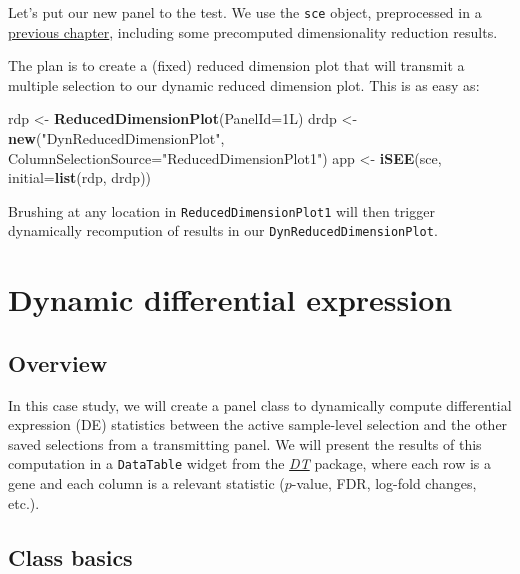 \documentclass[
]{book}
\newenvironment{Shaded}{\begin{snugshade}}{\end{snugshade}}
\newcommand{\DataTypeTok}[1]{\textcolor[rgb]{0.13,0.29,0.53}{#1}}
\newcommand{\KeywordTok}[1]{\textcolor[rgb]{0.13,0.29,0.53}{\textbf{#1}}}
\newcommand{\NormalTok}[1]{#1}
\newcommand{\StringTok}[1]{\textcolor[rgb]{0.31,0.60,0.02}{#1}}
\begin{document}
Let's put our new panel to the test.
We use the \texttt{sce} object, preprocessed in a \protect\hyperlink{developing}{previous chapter}, including some precomputed dimensionality reduction results.

The plan is to create a (fixed) reduced dimension plot that will transmit a multiple selection to our dynamic reduced dimension plot.
This is as easy as:

\begin{Shaded}
\begin{Highlighting}[]
\NormalTok{rdp <-}\StringTok{ }\KeywordTok{ReducedDimensionPlot}\NormalTok{(}\DataTypeTok{PanelId=}\NormalTok{1L)}
\NormalTok{drdp <-}\StringTok{ }\KeywordTok{new}\NormalTok{(}\StringTok{"DynReducedDimensionPlot"}\NormalTok{, }\DataTypeTok{ColumnSelectionSource=}\StringTok{"ReducedDimensionPlot1"}\NormalTok{)}
\NormalTok{app <-}\StringTok{ }\KeywordTok{iSEE}\NormalTok{(sce, }\DataTypeTok{initial=}\KeywordTok{list}\NormalTok{(rdp, drdp))}
\end{Highlighting}
\end{Shaded}

Brushing at any location in \texttt{ReducedDimensionPlot1} will then trigger dynamically recompution of results in our \texttt{DynReducedDimensionPlot}.

\hypertarget{dynamic-differential-expression}{%
\chapter{Dynamic differential expression}\label{dynamic-differential-expression}}

\hypertarget{overview}{%
\section{Overview}\label{overview}}

In this case study, we will create a panel class to dynamically compute differential expression (DE) statistics between the active sample-level selection and the other saved selections from a transmitting panel.
We will present the results of this computation in a \texttt{DataTable} widget from the \emph{\href{https://CRAN.R-project.org/package=DT}{DT}} package, where each row is a gene and each column is a relevant statistic (\(p\)-value, FDR, log-fold changes, etc.).

\hypertarget{class-basics}{%
\section{Class basics}\label{class-basics}}
\end{document}

